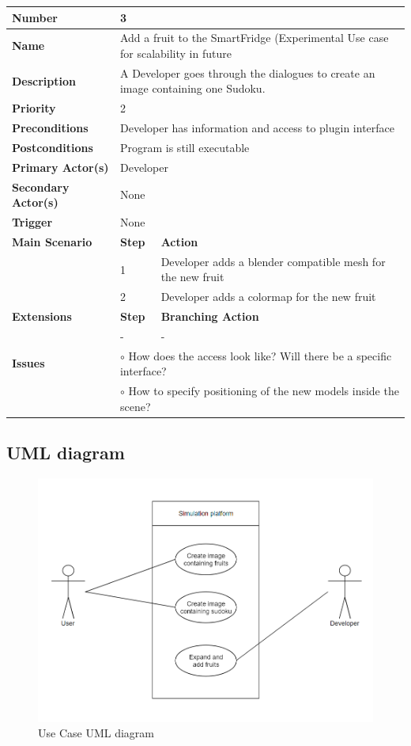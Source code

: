 \documentclass[a4paper,12pt]{article}
\begin{document}
\begin{tabularx}{\linewidth}{|l|l|X|}
\hline
\textbf{Number} & \multicolumn{2}{l|}{3} \\
\hline
\textbf{Name} & \multicolumn{2}{X|}{Add a fruit to the SmartFridge (Experimental Use case for scalability in future} \\
\hline
\textbf{Description} &  \multicolumn{2}{X|}{A Developer goes through the dialogues to create an image containing one Sudoku.} \\
\hline
\textbf{Priority} & \multicolumn{2}{l|}{2} \\
\hline
\textbf{Preconditions} & \multicolumn{2}{l|}{Developer has information and access to plugin interface} \\
\hline
\textbf{Postconditions} & \multicolumn{2}{l|}{Program is still executable} \\
\hline
\textbf{Primary Actor(s)} & \multicolumn{2}{l|}{Developer} \\
\hline
\textbf{Secondary Actor(s)} & \multicolumn{2}{l|}{None} \\
\hline
\textbf{Trigger} & \multicolumn{2}{l|}{None} \\
\hline
\textbf{Main Scenario} & \textbf{Step} & \textbf{Action} \\
\hline
 & 1 & Developer adds a blender compatible mesh for the new fruit\\
\cline{2-3}
 & 2 & Developer adds a colormap for the new fruit \\
\hline
\textbf{Extensions} & \textbf{Step} & \textbf{Branching Action} \\
\hline
 & - & - \\
\hline
\textbf{Issues} &  \multicolumn{2}{X|}{
 $\circ$ How does the access look like? Will there be a specific interface?
 } \\
 &  \multicolumn{2}{X|}{$\circ$ How to specify positioning of the new models inside the scene?}\\
\hline
\end{tabularx}
\subsection{UML diagram}
\begin{figure}[H]
\centering
\includegraphics[scale=0.65]{usecase_new_1.png}
\caption{Use Case UML diagram}
\end{figure}
\end{document}
